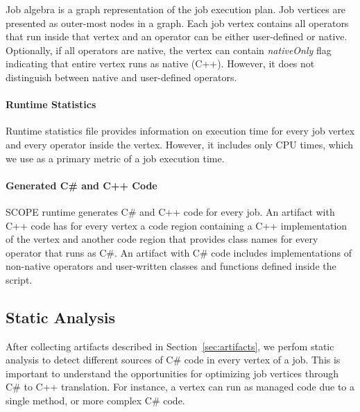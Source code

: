 Job algebra is a graph representation of the job execution plan. Job vertices are presented as outer-most nodes in a graph. Each job vertex contains all operators that run inside that vertex and an operator can be either user-defined or native. Optionally, if all operators are native, the vertex can contain \emph{nativeOnly} flag indicating that entire vertex runs as native (C++). However, it does not distinguish between native and user-defined operators.


\paragraph{Runtime Statistics}
Runtime statistics file provides information on execution time for every job vertex and every operator inside the vertex. However, it includes only CPU times, which we use as a primary metric of a job execution time. 



\paragraph{Generated C\# and C++ Code}
SCOPE runtime generates C\# and C++ code for every job. An artifact with C++ code has for every vertex a code region containing a C++ implementation of the vertex and another code region that provides class names for every operator that runs as C\#. An artifact with C\# code includes implementations of non-native operators and user-written classes and functions defined inside the script.

\subsection{Static Analysis}

After collecting artifacts described in Section~\ref{sec:artifacts}, we perfom static analysis to detect different sources of C\# code in every vertex of a job. This is important to understand the opportunities for optimizing job vertices through C\# to C++ translation. For instance, a vertex can run as managed code due to a single method, or more complex C\# code.


